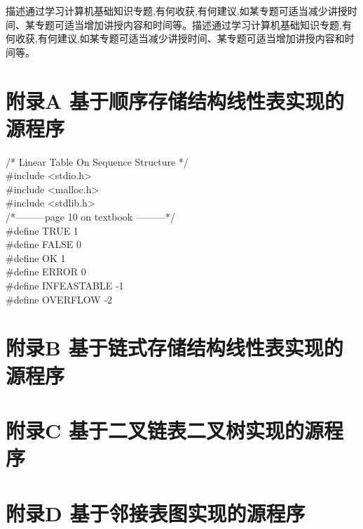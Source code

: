 \documentclass[supercite]{Experimental_Report}
\theoremstyle{definition}
\begin{document}
描述通过学习计算机基础知识专题,有何收获,有何建议,如某专题可适当减少讲授时间、某专题可适当增加讲授内容和时间等。描述通过学习计算机基础知识专题,有何收获,有何建议,如某专题可适当减少讲授时间、某专题可适当增加讲授内容和时间等。


\nocite{*} %



\setcounter{secnumdepth}{0}
\appendix

\section{附录A 基于顺序存储结构线性表实现的源程序}

\noindent
/* Linear Table On Sequence Structure */\\
\#include <stdio.h>\\
\#include <malloc.h>\\
\#include <stdlib.h>\\

\noindent
/*---------page 10 on textbook ---------*/\\
\#define TRUE 1\\
\#define FALSE 0\\
\#define OK 1\\
\#define ERROR 0\\
\#define INFEASTABLE -1\\
\#define OVERFLOW -2\\
\newpage
\section{附录B 基于链式存储结构线性表实现的源程序}
\newpage
\section{附录C 基于二叉链表二叉树实现的源程序}
\newpage
\section{附录D 基于邻接表图实现的源程序}
\end{document}
